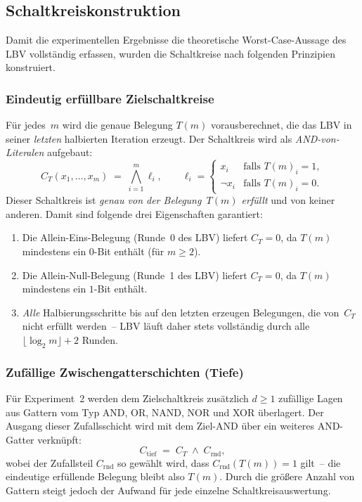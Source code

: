 ﻿\documentclass[a4paper,12pt]{article}
\theoremstyle{definition}
\begin{document}
\subsection{Schaltkreiskonstruktion}
\label{subsec:schaltkreis-konstruktion}

Damit die experimentellen Ergebnisse die theoretische Worst-Case-Aussage des LBV
vollständig erfassen, wurden die Schaltkreise nach folgenden Prinzipien konstruiert.

\subsubsection{Eindeutig erfüllbare Zielschaltkreise}

Für jedes~$m$ wird die genaue Belegung $T(m)$ vorausberechnet, die das LBV in seiner
\emph{letzten} halbierten Iteration erzeugt.  Der Schaltkreis wird als
\emph{AND-von-Literalen} aufgebaut:
\[
  C_{T}(x_1,\ldots,x_m)
  \;=\;
  \bigwedge_{i=1}^{m} \ell_i,
  \qquad
  \ell_i =
  \begin{cases}
    x_i       & \text{falls } T(m)_i = 1, \\
    \neg x_i  & \text{falls } T(m)_i = 0.
  \end{cases}
\]
Dieser Schaltkreis ist \emph{genau von der Belegung~$T(m)$ erfüllt} und von keiner anderen.
Damit sind folgende drei Eigenschaften garantiert:

\begin{enumerate}
  \item Die Allein-Eins-Belegung (Runde~0 des LBV) liefert $C_T = 0$, da $T(m)$
    mindestens ein $0$-Bit enthält (für $m \geq 2$).
  \item Die Allein-Null-Belegung (Runde~1 des LBV) liefert $C_T = 0$, da $T(m)$
    mindestens ein $1$-Bit enthält.
  \item \emph{Alle} Halbierungsschritte bis auf den letzten erzeugen Belegungen, die
    von~$C_T$ nicht erfüllt werden~-- LBV läuft daher stets vollständig durch alle
    $\lfloor \log_2 m \rfloor + 2$ Runden.
\end{enumerate}

\subsubsection{Zufällige Zwischengatterschichten (Tiefe)}

Für Experiment~2 werden dem Zielschaltkreis zusätzlich $d \geq 1$ zufällige Lagen aus
Gattern vom Typ AND, OR, NAND, NOR und XOR überlagert.  Der Ausgang dieser Zufallsschicht
wird mit dem Ziel-AND über ein weiteres AND-Gatter verknüpft:
\[
  C_{\mathrm{tief}}
  \;=\;
  C_T \;\wedge\; C_{\mathrm{rnd}},
\]
wobei der Zufallsteil $C_{\mathrm{rnd}}$ so gewählt wird, dass $C_{\mathrm{rnd}}(T(m)) = 1$
gilt~-- die eindeutige erfüllende Belegung bleibt also $T(m)$.  Durch die größere Anzahl
von Gattern steigt jedoch der Aufwand für jede einzelne Schaltkreisauswertung.
\end{document}
